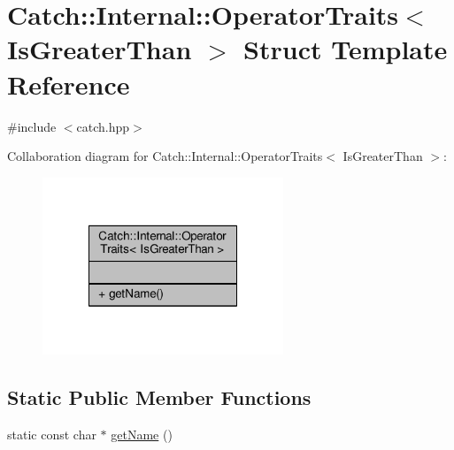 \hypertarget{struct_catch_1_1_internal_1_1_operator_traits_3_01_is_greater_than_01_4}{\section{Catch\-:\-:Internal\-:\-:Operator\-Traits$<$ Is\-Greater\-Than $>$ Struct Template Reference}
\label{struct_catch_1_1_internal_1_1_operator_traits_3_01_is_greater_than_01_4}
}


{\ttfamily \#include $<$catch.\-hpp$>$}



Collaboration diagram for Catch\-:\-:Internal\-:\-:Operator\-Traits$<$ Is\-Greater\-Than $>$\-:
\nopagebreak
\begin{figure}[H]
\begin{center}
\leavevmode
\includegraphics[width=204pt]{struct_catch_1_1_internal_1_1_operator_traits_3_01_is_greater_than_01_4__coll__graph}
\end{center}
\end{figure}
\subsection*{Static Public Member Functions}
\begin{DoxyCompactItemize}
\item 
static const char $\ast$ \hyperlink{struct_catch_1_1_internal_1_1_operator_traits_3_01_is_greater_than_01_4_ab917bfb9ccbe461dc684ee5a34d67d27}{get\-Name} ()
\end{DoxyCompactItemize}


